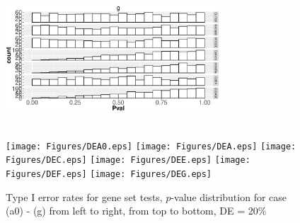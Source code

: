 \documentclass[11pt, a4paper]{article}
\begin{document}
\begin{figure}[H]
\begin{center}
				\includegraphics[width=8cm,height=5cm]{Figures/NODEG.eps}
			\end{center} 
		\end{figure} 
		
			\begin{figure}[H]
				\caption{Type I error rates for gene set tests, $p$-value distribution for case (a0) - (g) from left to right, from top to bottom, DE = 20\%}\label{fig:typeIerrorDE}
				\begin{center}
					\texttt{[image: Figures/DEA0.eps]}
					\texttt{[image: Figures/DEA.eps]}
					\texttt{[image: Figures/DEC.eps]}
					\texttt{[image: Figures/DEE.eps]}
					\texttt{[image: Figures/DEF.eps]}
					\texttt{[image: Figures/DEG.eps]}
				\end{center} 
			\end{figure} 
			
\end{document}
